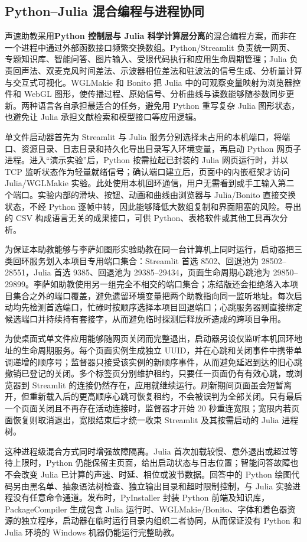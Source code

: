 \documentclass[UTF8,a4paper,zihao=-4]{ctexart}
\begin{document}
\subsection{Python--Julia 混合编程与进程协同}
声速助教采用\textbf{Python 控制层与 Julia 科学计算层分离}的混合编程方案，而非在一个进程中通过外部函数接口频繁交换数组。Python/Streamlit 负责统一网页、专题知识库、智能问答、图片输入、受限代码执行和应用生命周期管理；Julia 负责回声法、双麦克风时间差法、示波器相位差法和驻波法的信号生成、分析量计算与交互式可视化。WGLMakie 和 Bonito 把 Julia 中的可观察变量映射为浏览器控件和 WebGL 图形，使传播过程、原始信号、分析曲线与读数能够随参数同步更新\cite{software}。两种语言各自承担最适合的任务，避免用 Python 重写复杂 Julia 图形状态，也避免让 Julia 承担文献检索和模型接口等应用逻辑。

单文件启动器首先为 Streamlit 与 Julia 服务分别选择未占用的本机端口，将端口、资源目录、日志目录和持久化导出目录写入环境变量，再启动 Python 网页子进程。进入“演示实验”后，Python 按需拉起已封装的 Julia 网页运行时，并以 TCP 监听状态作为轻量就绪信号；确认端口建立后，页面中的内嵌框架才访问 Julia/WGLMakie 实验。此处使用本机回环通信，用户无需看到或手工输入第二个端口。实验内部的滑块、按钮、动画和曲线由浏览器与 Julia/Bonito 直接交换状态，不经 Python 逐帧中转，因此能够降低大数组复制和界面阻塞的风险。导出的 CSV 构成语言无关的成果接口，可供 Python、表格软件或其他工具再次分析。

为保证本助教能够与李萨如图形实验助教在同一台计算机上同时运行，启动器把三类回环服务划入本项目专用端口集合：Streamlit 首选 8502、回退池为 28502--28551，Julia 首选 9385、回退池为 29385--29434，页面生命周期心跳池为 29850--29899。李萨如助教使用另一组完全不相交的端口集合；冻结版还会拒绝落入本项目集合之外的端口覆盖，避免遗留环境变量把两个助教指向同一监听地址。每次启动均先检测首选端口，忙碌时按顺序选择本项目回退端口；心跳服务器则直接绑定候选端口并持续持有套接字，从而避免临时探测后释放所造成的跨项目争用。

为使桌面式单文件应用能够随网页关闭而完整退出，启动器另设仅监听本机回环地址的生命周期服务。每个页面实例生成独立 UUID，并在心跳和关闭事件中携带单调递增的顺序号；监督器只接受该实例的新顺序事件，从而避免延迟到达的旧心跳撤销已登记的关闭。多个标签页分别维护租约，只要任一页面仍有有效心跳，或浏览器到 Streamlit 的连接仍然存在，应用就继续运行。刷新期间页面虽会短暂离开，但重新载入后的更高顺序心跳可恢复租约，不会被误判为全部关闭。只有最后一个页面关闭且不再存在活动连接时，监督器才开始 20 秒重连宽限；宽限内若页面恢复则取消退出，宽限结束后才统一收束 Streamlit 及其按需启动的 Julia 进程树。

这种进程级混合方式同时增强故障隔离。Julia 首次加载较慢、意外退出或超过等待上限时，Python 仍能保留主页面，给出启动状态与日志位置；智能问答故障也不会改变 Julia 已计算的声速、时延、相位或波节数据。回答中的 Python 绘图代码另由黑名单、抽象语法树检查、独立输出目录和超时限制控制，与 Julia 实验进程没有任意命令通道。发布时，PyInstaller 封装 Python 前端及知识库，PackageCompiler 生成包含 Julia 运行时、WGLMakie/Bonito、字体和着色器资源的独立程序，启动器在临时运行目录内组织二者协同，从而保证没有 Python 和 Julia 环境的 Windows 机器仍能运行完整助教。
\end{document}
